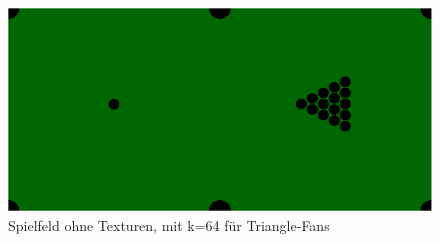 	\begin{figure}[h]
		\caption{Spielfeld ohne Texturen, mit k=64 für Triangle-Fans}
			\includegraphics[width=\textwidth]{bilder/untextured_pool_low.png} 
	\end{figure}

